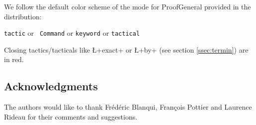 \noindent We follow the default color scheme of the \ssr{} mode for
ProofGeneral provided in the distribution:

\centerline{
\textcolor{dkblue}{\texttt{tactic}} or \textcolor{dkviolet}{\tt
  Command} or \textcolor{dkgreen}{\tt keyword} or
\textcolor{dkpink}{\tt tactical}}

\noindent Closing tactics/tacticals like \L+exact+ or \L+by+ (see section
\ref{ssec:termin}) are in red.

\subsection*{Acknowledgments}
The authors would like to thank Frédéric Blanqui, François Pottier
and Laurence Rideau for their comments and suggestions.

\newpage